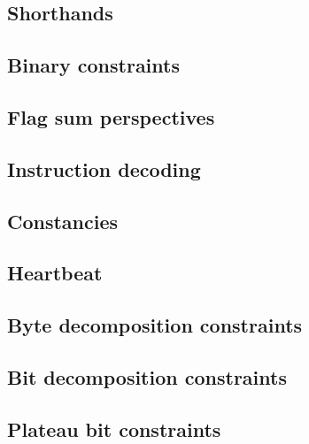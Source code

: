 \subsection{Shorthands}                                        \label{exp: general: shorthands}                        
\subsection{Binary constraints}                                \label{exp: general: binary}                            
\subsection{Flag sum perspectives}                             \label{exp: general: flag sums}                         
\subsection{Instruction decoding}                              \label{exp: general: instruction decoding}              
\subsection{Constancies}                                       \label{exp: general: constancies}                       
\subsection{Heartbeat}                                         \label{exp: general: heartbeat}                         
\subsection{Byte decomposition constraints}                    \label{exp: general: byte decompositions}               
\subsection{Bit decomposition constraints}                     \label{exp: general: bit decompositions}                
\subsection{Plateau bit constraints}                           \label{exp: general: plateau bit}                       

